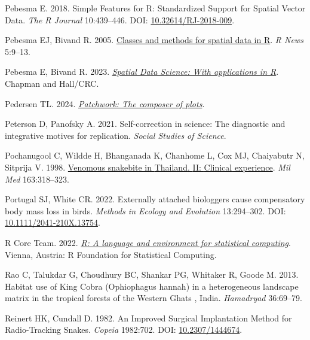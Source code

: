 \documentclass[10pt,a4paper]{article}
\newlength{\cslhangindent}
\newenvironment{CSLReferences}[2] %
 {\begin{list}{}{%
  \setlength{\itemindent}{0pt}
  \setlength{\leftmargin}{0pt}
  \setlength{\parsep}{0pt}
  \ifodd #1
   \setlength{\leftmargin}{\cslhangindent}
   \setlength{\itemindent}{-1\cslhangindent}
  \fi
  \setlength{\itemsep}{#2\baselineskip}}}
 {\end{list}}
\begin{document}
\begin{CSLReferences}{1}{0}
Pebesma E. 2018. {Simple Features for R: Standardized Support for Spatial Vector Data}. \emph{{The R Journal}} 10:439--446. DOI: \href{https://doi.org/10.32614/RJ-2018-009}{10.32614/RJ-2018-009}.

Pebesma EJ, Bivand R. 2005. \href{https://CRAN.R-project.org/doc/Rnews/}{Classes and methods for spatial data in {R}}. \emph{R News} 5:9--13.

Pebesma E, Bivand R. 2023. \emph{\href{https://r-spatial.org/book/}{{Spatial Data Science: With applications in R}}}. {Chapman and Hall/CRC}.

Pedersen TL. 2024. \emph{\href{https://CRAN.R-project.org/package=patchwork}{Patchwork: The composer of plots}}.

Peterson D, Panofsky A. 2021. Self-correction in science: {The} diagnostic and integrative motives for replication. \emph{Social Studies of Science}.

Pochanugool C, Wildde H, Bhanganada K, Chanhome L, Cox MJ, Chaiyabutr N, Sitprija V. 1998. \href{https://www.ncbi.nlm.nih.gov/pubmed/9597849}{Venomous snakebite in {Thailand}. {II}: {Clinical} experience}. \emph{Mil Med} 163:318--323.

Portugal SJ, White CR. 2022. Externally attached biologgers cause compensatory body mass loss in birds. \emph{Methods in Ecology and Evolution} 13:294--302. DOI: \href{https://doi.org/10.1111/2041-210X.13754}{10.1111/2041-210X.13754}.

R Core Team. 2022. \emph{\href{https://www.R-project.org/}{R: A language and environment for statistical computing}}. Vienna, Austria: R Foundation for Statistical Computing.

Rao C, Talukdar G, Choudhury BC, Shankar PG, Whitaker R, Goode M. 2013. Habitat use of {King} {Cobra} ({Ophiophagus} hannah) in a heterogeneous landscape matrix in the tropical forests of the {Western} {Ghats} , {India}. \emph{Hamadryad} 36:69--79.

Reinert HK, Cundall D. 1982. An {Improved} {Surgical} {Implantation} {Method} for {Radio}-{Tracking} {Snakes}. \emph{Copeia} 1982:702. DOI: \href{https://doi.org/10.2307/1444674}{10.2307/1444674}.


\end{CSLReferences}
\end{document}
